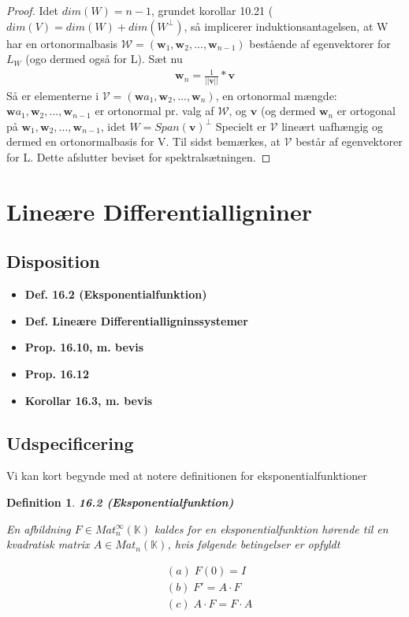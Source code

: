 \documentclass[paper=a4, fontsize=11pt]{scrartcl} %
\newtheorem*{definition}{Definition}
\newenvironment{cstmdefinition}[1]{\begin{definition} {\normalfont\textbf{#1}}}{\end{definition}}
\begin{document}
\begin{proof}
				Idet $dim(W)=n-1$, grundet korollar 10.21 ($dim(V)=dim(W)+dim(W^\bot)$, så implicerer induktionsantagelsen, at W har en ortonormalbasis $\mathcal{W}=(\mathbf{w}_1,\mathbf{w}_2,...,\mathbf{w}_{n-1})$ bestående af egenvektorer for $L_W$ (ogo dermed også for L). Sæt nu
				\begin{align*}
				\mathbf{w}_n=\frac{1}{||\mathbf{v}||}*\mathbf{v}
				\end{align*}
				Så er elementerne i $\mathcal{V}=(\mathbf{w}a_1,\mathbf{w}_2,...,\mathbf{w}_n)$, en ortonormal mængde: $\mathbf{w}a_1,\mathbf{w}_2,...,\mathbf{w}_{n-1}$ er ortonormal pr. valg af $\mathcal{W}$, og $\mathbf{v}$ (og dermed $\mathbf{w}_n$ er ortogonal på $\mathbf{w}_1,\mathbf{w}_2,...,\mathbf{w}_{n-1}$, idet $W=Span(\mathbf{v})^\bot$ Specielt er $\mathcal{V}$ lineært uafhængig og dermed en ortonormalbasis for V. Til sidst bemærkes, at $\mathcal{V}$ består af egenvektorer for L. Dette afslutter beviset for spektralsætningen. 
			\end{proof}
			
			\newpage
			
			\section{Lineære Differentialligniner}
			
			
			\subsection{Disposition}
			
			\begin{itemize}
				\item \textbf{Def. 16.2 (Eksponentialfunktion)}
				\item \textbf{Def. Lineære Differentialligninssystemer}
				\item \textbf{Prop. 16.10, m. bevis}
				\item \textbf{Prop. 16.12}
				\item \textbf{Korollar 16.3, m. bevis}
			\end{itemize}
			
			\subsection{Udspecificering}
			
			
			Vi kan kort begynde med at notere definitionen for eksponentialfunktioner
			
			\begin{cstmdefinition}{16.2 (Eksponentialfunktion)}
				
				En afbildning $F \in Mat_n^{\infty}(\mathbb{K})$ kaldes for en eksponentialfunktion hørende til en kvadratisk matrix $A \in Mat_n(\mathbb{K})$, hvis følgende betingelser er opfyldt
				
				\begin{align*}
				&(a) \; F(0) = I\\
				&(b) \; F' = A \cdot F \\
				&(c) \; A \cdot F = F \cdot A
				\end{align*}
				
			\end{cstmdefinition}
			
\end{document}
